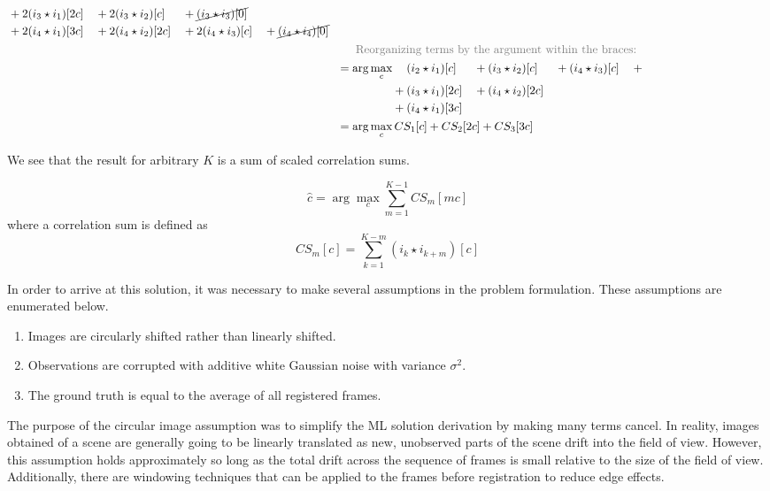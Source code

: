 \documentclass[tocnosub,noragright,centerchapter,12pt]{uiucecethesis09}
\begin{document}
\begin{align*}
\begin{aligned}
      &{}+{} 2(i_3 \star i_1)[2c] & {}+{}  &         2(i_3 \star i_2)[c]  & {}+{} &  \cancel{(i_3 \star i_3)[0]}  &                                       \\
      &{}+{} 2(i_4 \star i_1)[3c] & {}+{}  &         2(i_4 \star i_2)[2c] & {}+{} &         2(i_4 \star i_3)[c]   & {}+{} & \cancel{(i_4 \star i_4)[0]}   \\
    \end{aligned} \\
  & \eqlinecomment{Reorganizing terms by the argument within the braces:} \\
  & \begin{aligned}
      = \arg \max_c &\hphantom{{}+{}}
              (i_2 \star i_1)[c]  & {}+{} & (i_3 \star i_2)[c]   & {}+{} & (i_4 \star i_3)[c] & {}+{}  \\
      & {}+{} (i_3 \star i_1)[2c] & {}+{} & (i_4 \star i_2)[2c]  &       &                    &        \\
      & {}+{} (i_4 \star i_1)[3c] &       &                      &       &                    &
    \end{aligned} \\
  & \begin{aligned}
      = \arg \max_c CS_1[c] + CS_2[2c] + CS_3[3c]
    \end{aligned} \\
\end{align*}

We see that the result for arbitrary $K$ is a sum of scaled correlation sums.


$$\hat{c} = \arg \max_c \sum_{m=1}^{K-1} CS_m[mc]$$
where a correlation sum is defined as $$CS_m[c] = \sum_{k=1}^{K-m} (i_k \star i_{k+m})[c]$$

In order to arrive at this solution, it was necessary to make several assumptions in the problem formulation.  These assumptions are enumerated below.

\begin{enumerate}
    \item Images are circularly shifted rather than linearly shifted.
    \item Observations are corrupted with additive white Gaussian noise with variance $\sigma^2$.
    \item The ground truth is equal to the average of all registered frames.
\end{enumerate}

The purpose of the circular image assumption was to simplify the ML solution derivation by making many terms cancel.  In reality, images obtained of a scene are generally going to be linearly translated as new, unobserved parts of the scene drift into the field of view.  However, this assumption holds approximately so long as the total drift across the sequence of frames is small relative to the size of the field of view.  Additionally, there are windowing techniques that can be applied to the frames before registration to reduce edge effects.
\end{document}
